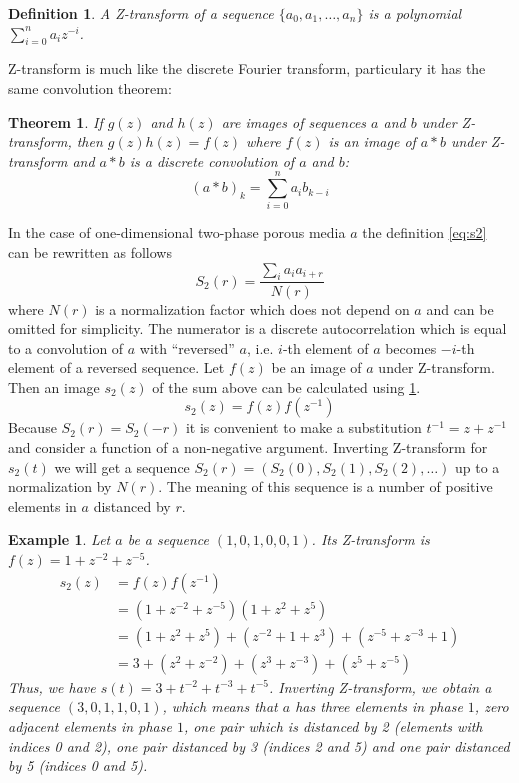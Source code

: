 \documentclass[12pt, a4paper]{article}
\newtheorem{definition}{Definition}
\newtheorem{example}{Example}
\newtheorem{theorem}{Theorem}
\begin{document}
\begin{definition}
  A Z-transform of a sequence $\{a_0, a_1, \dots, a_n\}$ is a polynomial
  $\sum_{i=0}^n a_i z^{-i}$.
\end{definition}
Z-transform is much like the discrete Fourier transform, particulary it has the
same convolution theorem:
\begin{theorem}
  If $g(z)$ and $h(z)$ are images of sequences $a$ and $b$ under Z-transform,
  then $g(z)h(z) = f(z)$ where $f(z)$ is an image of $a*b$ under Z-transform
  and $a*b$ is a discrete convolution of $a$ and $b$:
  \begin{equation*}
    (a*b)_k = \sum_{i=0}^{n} a_i b_{k-i}
  \end{equation*}
  \label{th:conv}
\end{theorem}
In the case of one-dimensional two-phase porous media $a$ the definition
\ref{eq:s2} can be rewritten as follows
\begin{equation*}
  S_2(r) = \frac{\sum_{i}a_ia_{i+r}}{N(r)}
\end{equation*}
where $N(r)$ is a normalization factor which does not depend on $a$ and can be
omitted for simplicity. The numerator is a discrete autocorrelation which is
equal to a convolution of $a$ with ``reversed'' $a$, i.e. $i$-th element of $a$
becomes $-i$-th element of a reversed sequence. Let $f(z)$ be an image of $a$
under Z-transform. Then an image $s_2(z)$ of the sum above can be calculated
using \cref{th:conv}.
\begin{equation}
  s_2(z) = f(z)f(z^{-1})
  \label{eq:s2z}
\end{equation}
Because $S_2(r) = S_2(-r)$ it is convenient to make a substitution $t^{-1} = z +
z^{-1}$ and consider a function of a non-negative argument. Inverting
Z-transform for $s_2(t)$ we will get a sequence
$S_2(r) = (S_2(0), S_2(1), S_2(2), \dots)$ up to a normalization by $N(r)$. The
meaning of this sequence is a number of positive elements in $a$ distanced by
$r$.
\begin{example}
  Let $a$ be a sequence $(1, 0, 1, 0, 0, 1)$. Its Z-transform is
  $f(z) = 1 + z^{-2} + z^{-5}$.
  \begin{align*}
    s_2(z) &= f(z)f(z^{-1}) \\
    &= (1 + z^{-2} + z^{-5})(1 + z^2 + z^5) \\
    &= (1 + z^2 + z^5) + (z^{-2} + 1 + z^3) + (z^{-5} + z^{-3} + 1) \\
    &= 3 + (z^2 + z^{-2}) + (z^3 + z^{-3}) + (z^5 + z^{-5})
  \end{align*}
  Thus, we have $s(t) = 3 + t^{-2} + t^{-3} + t^{-5}$. Inverting Z-transform, we
  obtain a sequence $(3, 0, 1, 1, 0, 1)$, which means that $a$ has three
  elements in phase $1$, zero adjacent elements in phase $1$, one pair which is
  distanced by 2 (elements with indices 0 and 2), one pair distanced by 3
  (indices 2 and 5) and one pair distanced by 5 (indices 0 and 5).
\end{example}
\end{document}
